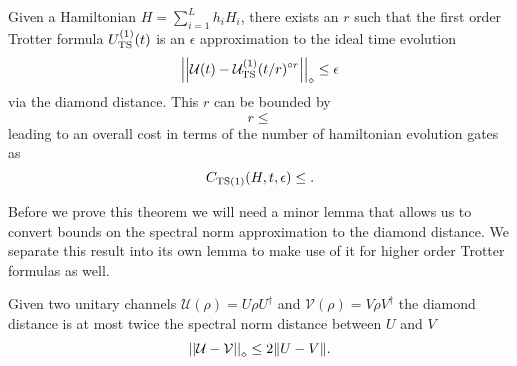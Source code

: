 \begin{theorem}
    Given a Hamiltonian $H = \sum_{i = 1}^L h_i H_i$, there exists an $r$ such that the first order Trotter formula $U_{\rm TS}^{(1)}(t)$ is an $\epsilon$ approximation to the ideal time evolution
    \begin{equation}
        \left| \left| \mathcal{U}(t) - \mathcal{U}_{\rm TS}^{(1)}(t/r)^{\circ r} \right| \right|_\diamond \le \epsilon
    \end{equation}
    via the diamond distance. This $r$ can be bounded by 
    \begin{equation}
        r \le
    \end{equation}
    leading to an overall cost in terms of the number of hamiltonian evolution gates as 
    \begin{equation}
        C_{\rm TS(1)}(H, t, \epsilon) \le .
    \end{equation}
\end{theorem}
Before we prove this theorem we will need a minor lemma that allows us to convert bounds on the spectral norm approximation to the diamond distance. We separate this result into its own lemma to make use of it for higher order Trotter formulas as well.
\begin{lemma}
    Given two unitary channels $\mathcal{U}(\rho) = U \rho U^\dagger$ and $\mathcal{V}(\rho) = V \rho V^\dagger$ the diamond distance is at most twice the spectral norm distance between $U$ and $V$
    \begin{equation}
        \left| \left| \mathcal{U} - \mathcal{V} \right| \right|_\diamond \le 2 \norm{U - V}.
    \end{equation}
\end{lemma}
